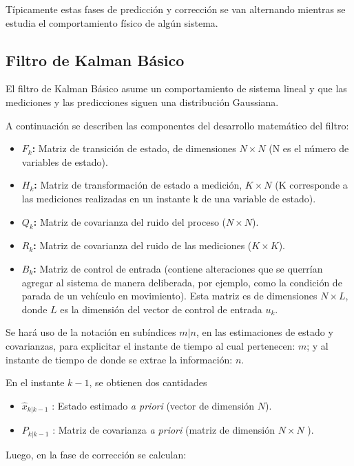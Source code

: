 T\'ipicamente estas fases de predicci\'on y correcci\'on se van alternando mientras se estudia el comportamiento f\'isico de alg\'un sistema.
\bigskip

\subsection{Filtro de Kalman B\'asico}
El filtro de Kalman B\'asico \cite{kalman} asume un comportamiento de sistema lineal y que las mediciones y las predicciones siguen una distribuci\'on Gaussiana. 
\bigskip

A continuaci\'on se describen las componentes del desarrollo matem\'atico del filtro:

\begin{itemize}
\item \textbf{$F_k$:} Matriz de transici\'on de estado, de dimensiones $N\times N$ (N es el n\'umero de variables de estado).
\item \textbf{$H_k$:} Matriz de transformaci\'on de estado a medici\'on, $K\times N$ (K corresponde a las mediciones realizadas en un instante k de una variable de estado).
\item \textbf{$Q_k$:} Matriz de covarianza del ruido del proceso ($N\times N$).
\item \textbf{$R_k$:} Matriz de covarianza del ruido de las mediciones ($K\times K$).
\item \textbf{$B_k$:} Matriz de control de entrada (contiene alteraciones que se querr\'ian agregar al sistema de manera deliberada, por ejemplo, como la condici\'on de parada de un veh\'iculo en movimiento). Esta matriz es de dimensiones $N\times L$, donde $L$ es la dimensi\'on del vector de control de entrada $u_k$.
\end{itemize}
\bigskip
Se har\'a uso de la notaci\'on en sub\'indices $m|n$, en las estimaciones de estado y covarianzas, para explicitar el instante de tiempo al cual pertenecen:  $m$; y al instante de tiempo de donde se extrae la informaci\'on: $n$.
\bigskip

En el instante $k-1$, se obtienen dos cantidades 
\begin{itemize}
\item $\hat{x}_{k|k-1}$ : Estado estimado \textit{a priori} (vector de dimensi\'on $N$). 
\item $P_{k|k-1}$ : Matriz de covarianza \textit{a priori} (matriz de dimensi\'on $N\times N$ ).
\end{itemize}
\bigskip

Luego, en la fase de correcci\'on se calculan:

